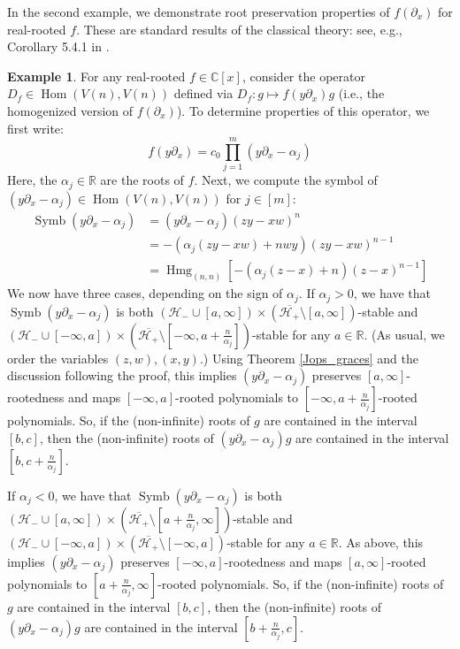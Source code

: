 \documentclass{article}
\theoremstyle{definition}
\newtheorem{example}[theorem]{Example}
\theoremstyle{plain}
\newcommand{\C}{\mathbb{C}}
\newcommand{\R}{\mathbb{R}}
\newcommand{\UHP}{\mathcal{H}_+}
\newcommand{\LHP}{\mathcal{H}_-}
\DeclareMathOperator{\Hmg}{Hmg}
\DeclareMathOperator{\Symb}{Symb}
\DeclareMathOperator{\Hom}{Hom}
\begin{document}
In the second example, we demonstrate root preservation properties of $f(\partial_x)$ for real-rooted $f$. These are standard results of the classical theory: see, e.g., Corollary 5.4.1 in \cite{rahman2002anthpoly}.

\begin{example}
    For any real-rooted $f \in \C[x]$, consider the operator $D_f \in \Hom(V(n),V(n))$ defined via $D_f: g \mapsto f(y\partial_x)g$ (i.e., the homogenized version of $f(\partial_x)$). To determine properties of this operator, we first write:
    \[
        f(y\partial_x) = c_0 \prod_{j=1}^m (y\partial_x - \alpha_j)
    \]
    Here, the $\alpha_j \in \R$ are the roots of $f$. Next, we compute the symbol of $(y\partial_x - \alpha_j) \in \Hom(V(n),V(n))$ for $j \in [m]$:
    \[
        \begin{split}
            \Symb(y\partial_x - \alpha_j) &= (y\partial_x - \alpha_j)(zy-xw)^n \\
                &= -(\alpha_j (zy-xw) + nwy)(zy-xw)^{n-1} \\
                &= \Hmg_{(n,n)}\left[-(\alpha_j(z-x)+n)(z-x)^{n-1}\right]
        \end{split}
    \]
    We now have three cases, depending on the sign of $\alpha_j$. If $\alpha_j > 0$, we have that $\Symb(y\partial_x - \alpha_j)$ is both $(\LHP \cup [a,\infty]) \times (\overline{\UHP} \setminus [a,\infty])$-stable and $(\LHP \cup [-\infty,a]) \times (\overline{\UHP} \setminus [-\infty,a+\frac{n}{\alpha_j}])$-stable for any $a \in \R$. (As usual, we order the variables $(z,w),(x,y)$.) Using Theorem \ref{Jops_graces} and the discussion following the proof, this implies $(y\partial_x - \alpha_j)$ preserves $[a,\infty]$-rootedness and maps $[-\infty,a]$-rooted polynomials to $[-\infty,a+\frac{n}{\alpha_j}]$-rooted polynomials. So, if the (non-infinite) roots of $g$ are contained in the interval $[b,c]$, then the (non-infinite) roots of $(y\partial_x - \alpha_j)g$ are contained in the interval $[b,c+\frac{n}{\alpha_j}]$.
    
    If $\alpha_j < 0$, we have that $\Symb(y\partial_x - \alpha_j)$ is both $(\LHP \cup [a,\infty]) \times (\overline{\UHP} \setminus [a+\frac{n}{\alpha_j},\infty])$-stable and $(\LHP \cup [-\infty,a]) \times (\overline{\UHP} \setminus [-\infty,a])$-stable for any $a \in \R$. As above, this implies $(y\partial_x - \alpha_j)$ preserves $[-\infty,a]$-rootedness and maps $[a,\infty]$-rooted polynomials to $[a+\frac{n}{\alpha_j},\infty]$-rooted polynomials. So, if the (non-infinite) roots of $g$ are contained in the interval $[b,c]$, then the (non-infinite) roots of $(y\partial_x - \alpha_j)g$ are contained in the interval $[b+\frac{n}{\alpha_j},c]$.
    

\end{example}
\end{document}
